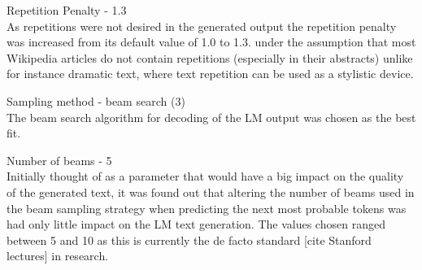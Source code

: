 Repetition Penalty - 1.3 \\
As repetitions were not desired in the generated output the repetition penalty was increased from its default value of 1.0 to 1.3. under the assumption that most Wikipedia articles do not contain repetitions (especially in their abstracts) unlike for instance dramatic text, where text repetition can be used as a stylistic device.

Sampling method - beam search (3) \\
The beam search algorithm for decoding of the LM output was chosen as the best fit.

Number of beams - 5 \\
Initially thought of as a parameter that would have a big impact on the quality of the generated text, it was found out that altering the number of beams used in the beam sampling strategy when predicting the next most probable tokens was had only little impact on the LM text generation. The values chosen ranged between 5 and 10 as this is currently the de facto standard [cite Stanford lectures] in research.
